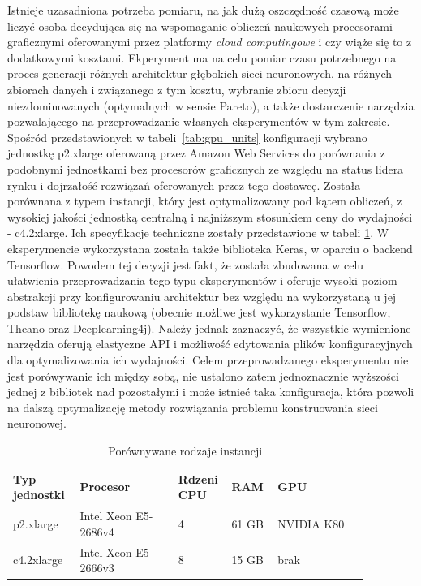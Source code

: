 \documentclass[12pt,a4paper,twoside]{article}
\begin{document}
Istnieje uzasadniona potrzeba pomiaru, na jak dużą oszczędność czasową może liczyć osoba decydująca się na wspomaganie obliczeń naukowych procesorami graficznymi oferowanymi przez platformy \textit{cloud computingowe} i czy wiąże się to z dodatkowymi kosztami. Ekperyment ma na celu pomiar czasu potrzebnego na proces generacji różnych architektur głębokich sieci neuronowych, na różnych zbiorach danych i związanego z tym kosztu, wybranie zbioru decyzji niezdominowanych (optymalnych w sensie Pareto), a także dostarczenie narzędzia pozwalającego na przeprowadzanie własnych eksperymentów w tym zakresie.
Spośród przedstawionych w tabeli~\ref{tab:gpu_units} konfiguracji wybrano jednostkę p2.xlarge oferowaną przez Amazon Web Services do porównania z podobnymi jednostkami bez procesorów graficznych ze względu na status lidera rynku i dojrzałość rozwiązań oferowanych przez tego dostawcę. Została porównana z typem instancji, który jest optymalizowany pod kątem obliczeń, z wysokiej jakości jednostką centralną i najniższym stosunkiem ceny do wydajności - c4.2xlarge. Ich specyfikacje techniczne zostały przedstawione w tabeli \ref{tab:aws_units}.
W eksperymencie wykorzystana została także biblioteka Keras, w oparciu o backend Tensorflow. Powodem tej decyzji jest fakt, że została zbudowana w celu ułatwienia przeprowadzania tego typu eksperymentów i oferuje wysoki poziom abstrakcji przy konfigurowaniu architektur bez względu na wykorzystaną u jej podstaw bibliotekę naukową (obecnie możliwe jest wykorzystanie Tensorflow, Theano oraz Deeplearning4j). Należy jednak zaznaczyć, że wszystkie wymienione narzędzia oferują elastyczne API i możliwość edytowania plików konfiguracyjnych dla optymalizowania ich wydajności. Celem przeprowadzanego eksperymentu nie jest porówywanie ich między sobą, nie ustalono zatem jednoznacznie wyższości jednej z bibliotek nad pozostałymi i może istnieć taka konfiguracja, która pozwoli na dalszą optymalizację metody rozwiązania problemu konstruowania sieci neuronowej.

\noindent
\begin{table}
  \begin{tabular}
    {p{0.16\linewidth}
    p{0.26\linewidth}
    p{0.09\linewidth}
    p{0.12\linewidth}
    p{0.24\linewidth}}
  \toprule
  Typ jednostki & Procesor & Rdzeni CPU & RAM & GPU \\
  \midrule
  p2.xlarge & Intel Xeon E5-2686v4 & 4 & 61 GB & NVIDIA K80 \\
  c4.2xlarge & Intel Xeon E5-2666v3 & 8 & 15 GB & brak \\
  \bottomrule
  \end{tabular}
  \caption{Porównywane rodzaje instancji}\label{tab:aws_units}
\end{table}
\end{document}

